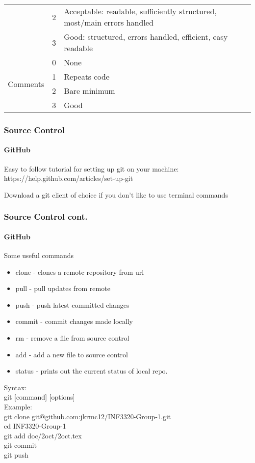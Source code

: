 \documentclass[11pt]{beamer}
\begin{document}
\begin{frame}
\begin{center}
{\begin{tabular}{ |l|l|l| }
 			& \cellcolor{green!85} 2 & \cellcolor{green!85} Acceptable: readable, sufficiently structured, 
 			most/main errors handled \\
	 		& \cellcolor{green!85} 3 & \cellcolor{green!85} Good: structured, errors handled, efficient, 
	 		easy readable \\ \hline
	 		\multirow{4}{*}{Comments}
 			& \cellcolor{red!85} 0 & \cellcolor{red!85} None \\
 			& \cellcolor{red!85} 1 & \cellcolor{red!85} Repeats code \\
 			& \cellcolor{green!85} 2 & \cellcolor{green!85} Bare minimum \\
	 		& \cellcolor{green!85} 3 & \cellcolor{green!85} Good \\
			\hline
		\end{tabular}
		}
	    \end{center}
    
  	\end{frame}

	\begin{frame}
	\frametitle{Source Control}
	\framesubtitle{GitHub}
	
	\begin{center}
	
	Easy to follow tutorial for setting up git on your machine: \\
	https://help.github.com/articles/set-up-git
	
	\end{center}
	Download a git client of choice if you don't like to use terminal commands
	\end{frame}	  	
  	
	\begin{frame}
	\frametitle{Source Control cont.}
	\framesubtitle{GitHub}
	Some useful commands
	\begin{itemize}
	\item clone - clones a remote repository from url
	\item pull - pull updates from remote
	\item push - push latest committed changes
	\item commit - commit changes made locally
	\item rm - remove a file from source control
	\item add - add a new file to source control
	\item status - prints out the current status of local repo.
	\end{itemize}
	
	Syntax:\\
	git [command] [options] \\
	Example:\\
	git clone git@github.com:jkrmc12/INF3320-Group-1.git \\
	cd INF3320-Group-1 \\
	git add doc/2oct/2oct.tex \\
	git commit \\
	git push \\
	
	\end{frame}  	
  	
\end{document}
